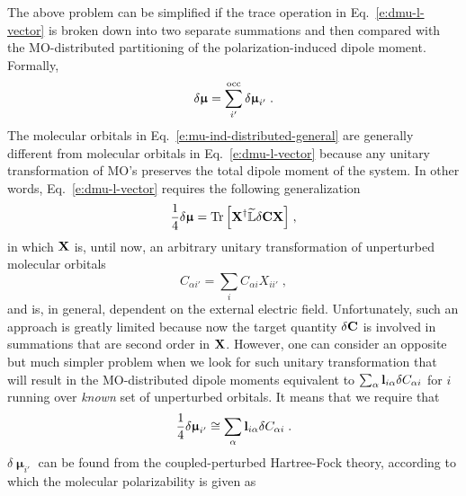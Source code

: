 \documentclass[aip,graphicx]{revtex4-1}
\newcommand{\BM}[1]{\bm{#1}}
\DeclareMathOperator{\Tr}{Tr}
\begin{document}
The above problem can be simplified if the trace operation in Eq.~\eqref{e:dmu-l-vector} is broken down into
two separate summations and then compared with the MO\hyp{}distributed partitioning 
of the polarization\hyp{}induced dipole moment. Formally,
%
\begin{equation} \label{e:mu-ind-distributed-general}
 \delta {\BM{\upmu}} = \sum_{i'}^{\rm occ} \delta {\BM{\upmu}}_{i'}  \;.
\end{equation}
%
The molecular orbitals in Eq.~\eqref{e:mu-ind-distributed-general}
are generally different from molecular orbitals in Eq.~\eqref{e:dmu-l-vector} because
any unitary transformation of MO's preserves the total dipole moment of the system. In other words,
Eq.~\eqref{e:dmu-l-vector} requires the following generalization
%
\begin{equation} \label{e:dmu-l-vector-X}
  \frac{1}{4} 
 \delta {\BM{\upmu}} %
   =
   \Tr{ 
    \left[ {\bf X}^\dagger
         \widetilde{\mathbb{L}}  \delta {\bf C}
          {\bf X}
    \right] } \;,
\end{equation}
%
in which ${\bf X}$ is, until now, an arbitrary unitary transformation of unperturbed molecular orbitals
%
\begin{equation}
 C_{\alpha i'} = \sum_i  C_{\alpha i} X_{ii'} \;,
\end{equation}
%
and is, in general, dependent on the external electric field.
Unfortunately, such an approach is greatly limited because now the target quantity $\delta {\bf C}$
is involved in summations that are second order in ${\bf X}$. However,
one can consider an opposite but much simpler problem when we look for such unitary transformation
that will result in the MO\hyp{}distributed dipole moments equivalent to 
$\sum_\alpha {\bf l}_{i\alpha} \delta C_{\alpha i}$ for $i$ running over \emph{known} set of unperturbed orbitals.
It means that we require that
%
\begin{equation} \label{e:dmu-l-vector-mo-transform}
 \frac{1}{4} \delta {\BM{\upmu}}_{i'}
   \cong
   \sum_\alpha {\bf l}_{i\alpha} \delta C_{\alpha i} \;.
\end{equation}
%
$\delta {\BM{\upmu}}_{i'}$ can be found from the coupled\hyp{}perturbed Hartree\hyp{}Fock theory,
according to which the molecular polarizability is given as 
\end{document}
